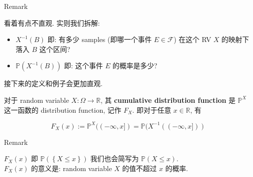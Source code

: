 \begin{qlremark}{Remark}

看着有点不直观. 实则我们拆解:

\begin{itemize}
\item
  \(\mathit{X}^{- 1}(\mathit{B})\) 即: 有多少 samples (即哪一个事件 \(\mathit{E} \in \mathcal{F}\)) 在这个 RV \(\mathit{X}\) 的映射下落入 \(\mathit{B}\) 这个区间?
\item
  \(\mathbb{P}(\mathit{X}^{- 1}(\mathit{B}))\) 即: 这个事件 \(\mathit{E}\) 的概率是多少?
\end{itemize}

接下来的定义和例子会更加直观.

\end{qlremark}

\begin{definition}{}

对于 random variable \(\mathit{X}:\Omega\rightarrow\mathbb{R}\), 其 \textbf{cumulative distribution function} 是 \(\mathbb{P}^{\mathit{X}}\) 这一函数的 distribution function, 记作 \(\mathit{F}_{\mathit{X}}\). 即对于任意 \(\mathit{x} \in \mathbb{R}\), 有

\[\mathit{F}_{\mathit{X}}(\mathit{x}) := \mathbb{P}^{\mathit{X}}(( - \infty,\mathit{x}\rbrack) = \mathbb{P}(\mathit{X}^{- 1}(( - \infty,\mathit{x}\rbrack))\]

\end{definition}

\begin{qlremark}{Remark}

\(\mathit{F}_{\mathit{X}}(\mathit{x})\) 即 \(\mathbb{P}(\left\{ {\mathit{X} \leq \mathit{x}} \right\})\) 我们也会简写为 \(\mathbb{P}(\mathit{X} \leq \mathit{x})\).\\
\(\mathit{F}_{\mathit{X}}(\mathit{x})\) 的意义是: random variable \(\mathit{X}\) 的值不超过 \(\mathit{x}\) 的概率.\\

\end{qlremark}

